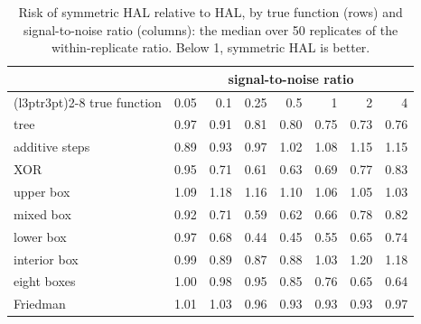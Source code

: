 \begin{table}[!h]
\centering
\caption{\label{tab:tier1_ratio}Risk of symmetric HAL relative to HAL, by true function (rows) and signal-to-noise ratio (columns): the median over 50 replicates of the within-replicate ratio. Below 1, symmetric HAL is better.}
\centering
\begin{tabular}[t]{lrrrrrrr}
\toprule
\multicolumn{1}{c}{ } & \multicolumn{7}{c}{signal-to-noise ratio} \\
\cmidrule(l{3pt}r{3pt}){2-8}
true function & 0.05 & 0.1 & 0.25 & 0.5 & 1 & 2 & 4\\
\midrule
tree & 0.97 & 0.91 & 0.81 & 0.80 & 0.75 & 0.73 & 0.76\\
additive steps & 0.89 & 0.93 & 0.97 & 1.02 & 1.08 & 1.15 & 1.15\\
XOR & 0.95 & 0.71 & 0.61 & 0.63 & 0.69 & 0.77 & 0.83\\
upper box & 1.09 & 1.18 & 1.16 & 1.10 & 1.06 & 1.05 & 1.03\\
mixed box & 0.92 & 0.71 & 0.59 & 0.62 & 0.66 & 0.78 & 0.82\\
lower box & 0.97 & 0.68 & 0.44 & 0.45 & 0.55 & 0.65 & 0.74\\
interior box & 0.99 & 0.89 & 0.87 & 0.88 & 1.03 & 1.20 & 1.18\\
eight boxes & 1.00 & 0.98 & 0.95 & 0.85 & 0.76 & 0.65 & 0.64\\
Friedman & 1.01 & 1.03 & 0.96 & 0.93 & 0.93 & 0.93 & 0.97\\
\bottomrule
\end{tabular}
\end{table}

